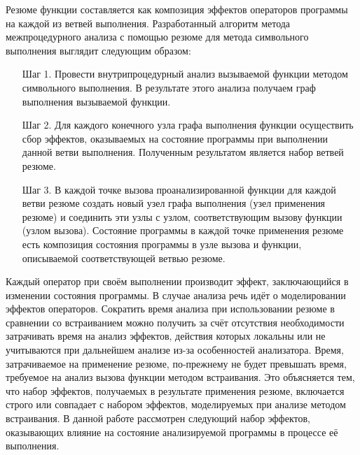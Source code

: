 Резюме функции составляется как композиция эффектов операторов программы на каждой из ветвей выполнения. Разработанный алгоритм метода межпроцедурного анализа с помощью резюме для метода символьного выполнения выглядит следующим образом:

\begin{enumerate}
 \item[Шаг 1.] Провести внутрипроцедурный анализ вызываемой функции методом символьного выполнения. В результате этого анализа получаем граф выполнения вызываемой функции.
 \item[Шаг 2.] Для каждого конечного узла графа выполнения функции осуществить сбор эффектов, оказываемых на состояние программы при выполнении данной ветви выполнения. Полученным результатом является набор ветвей резюме.
 \item[Шаг 3.] В каждой точке вызова проанализированной функции для каждой ветви резюме создать новый узел графа выполнения (узел применения резюме) и соединить эти узлы с узлом, соответствующим вызову функции (узлом вызова). Состояние программы в каждой точке применения резюме есть композиция состояния программы в узле вызова и функции, описываемой соответствующей ветвью резюме.
\end{enumerate}

Каждый оператор при своём выполнении производит эффект, заключающийся в изменении состояния программы. В случае анализа речь идёт о моделировании эффектов операторов. Сократить время анализа при использовании резюме в сравнении со встраиванием можно получить за счёт отсутствия необходимости затрачивать время на анализ эффектов, действия которых локальны или не учитываются при дальнейшем анализе из-за особенностей анализатора. Время, затрачиваемое на применение резюме, по-прежнему не будет превышать время, требуемое на анализ вызова функции методом встраивания. Это объясняется тем, что набор эффектов, получаемых в результате применения резюме, включается строго или совпадает с набором эффектов, моделируемых при анализе методом встраивания. В данной работе рассмотрен следующий набор эффектов, оказывающих влияние на состояние анализируемой программы в процессе её выполнения.

